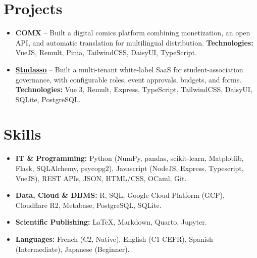 \documentclass[11pt,a4paper]{article}
\begin{document}
\section*{Projects}
\begin{itemize}[leftmargin=0.4cm, itemsep=2pt]
    \item \textbf{COMX} -- Built a digital comics platform combining monetization, an open API, and automatic translation for multilingual distribution.
    \textbf{Technologies:} VueJS, Remult, Pinia, TailwindCSS, DaisyUI, TypeScript.
    \item \textbf{\href{https://studasso.fr/home}{Studasso}} -- Built a multi-tenant white-label SaaS for student-association governance, with configurable roles, event approvals, budgets, and forms.
    \textbf{Technologies:} Vue 3, Remult, Express, TypeScript, TailwindCSS, DaisyUI, SQLite, PostgreSQL.
\end{itemize}

\section*{Skills}
\begin{itemize}[leftmargin=0.4cm, itemsep=1pt]
    \item \textbf{IT \& Programming:} Python (NumPy, pandas, scikit-learn, Matplotlib, Flask, SQLAlchemy, psycopg2), Javascript (NodeJS, Express, Typescript, VueJS), REST APIs, JSON, HTML/CSS, OCaml, Git.
    \item \textbf{Data, Cloud \& DBMS:} R, SQL, Google Cloud Platform (GCP), Cloudflare R2, Metabase, PostgreSQL, SQLite.
    \item \textbf{Scientific Publishing:} \LaTeX, Markdown, Quarto, Jupyter.
    \item \textbf{Languages:} French (C2, Native), English (C1 CEFR), Spanish (Intermediate), Japanese (Beginner).
\end{itemize}
\end{document}
